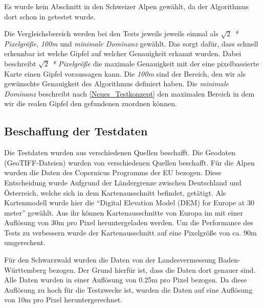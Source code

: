 Es wurde kein Abschnitt in den Schweizer Alpen gewählt, da der Algorithmus dort schon in  getestet wurde.

Die Vergleichsbereich werden bei den Tests jeweils jeweils einmal als \textit{$\sqrt{2}$ * Pixelgröße}, \textit{100m} und \textit{minimale Dominanz} gewählt. Das sorgt dafür, dass schnell erkennbar ist welche Gipfel auf welcher Genauigkeit erkannt wurden. Dabei beschreibt \textit{$\sqrt{2}$ * Pixelgröße} die maximale Genauigkeit mit der eine pixelbassierte Karte einen Gipfel voraussagen kann. Die \textit{100m} sind der Bereich, den wir als gewünschte Genauigkeit des Algorithmus definiert haben. Die \textit{minimale Dominanz} beschreibt nach \ref{Neues_Testkonzept} den maximalen Bereich in dem wir die realen Gipfel den gefundenen zuordnen können.

\subsection{Beschaffung der Testdaten}
Die Testdaten wurden aus verschiedenen Quellen beschafft. Die Geodaten (GeoTIFF-Dateien) wurden von verschiedenen Quellen beschafft. Für die Alpen wurden die Daten des Copernicus Programms der EU  bezogen. Diese Entscheidung wurde Aufgrund der Ländergrenze zwischen Deutschland und Österreich, welche sich in dem Kartenausschnitt befindet, getätigt. Als Kartenmodell wurde hier die \enquote{Digital Elevation Model (DEM) for Europe at 30 meter} gewählt. Aus ihr können Kartenausschnitte von Europa im mit einer Auflösung von 30m pro Pixel heruntergeladen werden. Um die Performance des Tests zu verbessern wurde der Kartenausschnitt auf eine Pixelgröße von ca. 90m umgerechent.

Für den Schwarzwald wurden die Daten von der Landesvermessung Baden-Württemberg bezogen. Der Grund hierfür ist, dass die Daten dort genauer sind. Alle Daten wurden in einer Auflösung von 0.25m pro Pixel bezogen. Da diese Auflösung zu hoch für die Testzwecke ist, wurden die Daten auf eine Auflösung von 10m pro Pixel heruntergerechnet.

